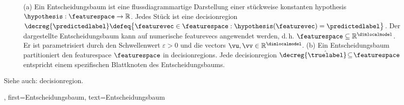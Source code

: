 {{{{{{\begin{figure}[H]
\begin{minipage}{.45\textwidth}
		\end{minipage}
		\caption{(a) Ein Entscheidungsbaum ist eine flussdiagrammartige Darstellung einer stückweise konstanten \gls{hypothesis} $\hypothesis: \featurespace \rightarrow \mathbb{R}$.  
		Jedes Stück ist eine \gls{decisionregion} $\decreg{\predictedlabel} \defeq \big\{ \featurevec \in  \featurespace: \hypothesis(\featurevec) = \predictedlabel \big\}$. 
		Der dargestellte Entscheidungsbaum kann auf numerische \glspl{featurevec} angewendet werden, d.\,h. $\featurespace \subseteq \mathbb{R}^{\dimlocalmodel}$. Er ist parametrisiert 
		durch den Schwellenwert $\varepsilon>0$ und die \glspl{vector} $\vu, \vv \in \mathbb{R}^{\dimlocalmodel}$. 
		(b) Ein Entscheidungsbaum partitioniert den \gls{featurespace} $\featurespace$ in \glspl{decisionregion}. Jede \gls{decisionregion}  
		$\decreg{\hat{\truelabel}} \!\subseteq\!\featurespace$ entspricht einem spezifischen Blattknoten des Entscheidungsbaums.}
		\label{fig_decision_tree_dict}
		\end{figure} 
		Siehe auch: \gls{decisionregion}.},
	  first={Entscheidungsbaum},
	  text={Entscheidungsbaum} 
}

}}}}
